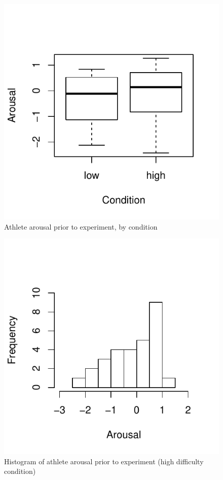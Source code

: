 \begin{figure}
  \centering
  \includegraphics[width=0.5\linewidth,keepaspectratio] {images/arousalFactorPreBoxPlot-1}
  \caption{Athlete arousal prior to experiment, by condition}
        \label{fig:arousalFactorPreBoxPlot}
    \end{figure}

\begin{figure}
  \centering
      \includegraphics[width=0.5\linewidth,keepaspectratio] {images/histArousalFactorPreHigh-1}
      \caption{Histogram of athlete arousal prior to experiment (high difficulty condition)}
        \label{fig:histArousalFactorPreHigh}
    \end{figure}

